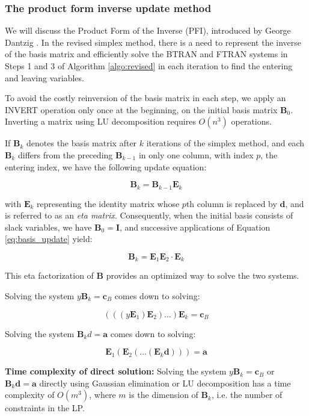 \subsubsection{The product form inverse update method}

We will discuss the Product Form of the Inverse (PFI), introduced by
George Dantzig \parencite{dantzig1954product}. In the revised simplex method,
there is a need to represent the inverse of the basis matrix and efficiently
solve the BTRAN and FTRAN systems in Steps 1 and 3 of Algorithm \ref{algo:revised}
in each iteration to find the entering and leaving variables.

To avoid the costly reinversion of the basis matrix in each step,
we apply an INVERT operation only once at the beginning, on the initial basis
matrix \(\mathbf{B}_0\). Inverting a matrix using LU decomposition requires \(O(n^3)\)
operations.

If \(\mathbf{B}_k\) denotes the basis matrix after \(k\)
iterations of the simplex method, and each \(\mathbf{B}_k\) differs from the
preceding \(\mathbf{B}_{k-1}\) in only one column, with index $p$, the entering index,
we have the following update equation:

\[
    \mathbf{B}_k = \mathbf{B}_{k-1}\mathbf{E}_k \label{eq:basis_update}
\]

with \(\mathbf{E}_k\) representing the identity matrix whose \(p\)th column
is replaced by \(\mathbf{d}\), and is referred to as an \textit{eta matrix}.
Consequently, when the initial basis consists of slack variables,
we have \(\mathbf{B}_0 = \mathbf{I}\), and successive applications of
Equation \ref{eq:basis_update} yield:

\[
    \mathbf{B}_k = \mathbf{E}_1\mathbf{E}_2 \cdot \mathbf{E}_k \label{eq:eta_factorization}
\]

This eta factorization of \(\mathbf{B}\) provides an optimized way
to solve the two systems.

Solving the system \(y\mathbf{B}_k = \mathbf{c}_B\) comes down to solving:

\[
    (((y\mathbf{E}_1)\mathbf{E}_2) \ldots )\mathbf{E}_{k} = \mathbf{c}_B
\]

Solving the system \(\mathbf{B}_kd = \mathbf{a}\) comes down to solving:

\[
    \mathbf{E}_1(\mathbf{E}_2( \ldots (\mathbf{E}_{k}\mathbf{d}))) = \mathbf{a}
\]

\textbf{Time complexity of direct solution:}
Solving the system \(y\mathbf{B}_k = \mathbf{c}_B\) or \(\mathbf{B}_k\mathbf{d} = \mathbf{a}\) directly using
Gaussian elimination or LU decomposition has a time complexity of \(O(m^3)\),
where \(m\) is the dimension of \(\mathbf{B}_k\), i.e. the number of constraints in the LP.

